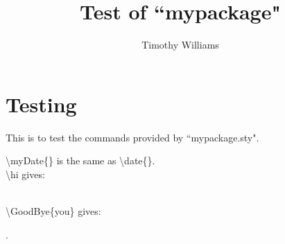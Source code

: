 \documentclass[11pt]{amsart}
\title{Test of ``mypackage"}
\author{Timothy Williams}
\def\tbs{\textbackslash}
\begin{document}
\maketitle

\section{Testing}
This is to test the commands provided by ``mypackage.sty".

\tbs{}myDate\{\} is the same as \tbs{}date\{\}.\\

\tbs{}hi gives:

\hi\\

\tbs{}GoodBye\{you\} gives:

.

%
%
\end{document}
